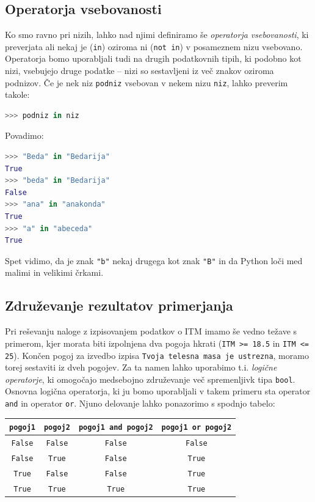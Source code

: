 \subsection{Operatorja vsebovanosti}

Ko smo ravno pri nizih, lahko nad njimi definiramo še \emph{operatorja vsebovanosti}, ki preverjata ali nekaj je (\texttt{in}) oziroma ni (\texttt{not in}) v posameznem nizu vsebovano. Operatorja bomo uporabljali tudi na drugih podatkovnih tipih, ki podobno kot nizi, vsebujejo druge podatke -- nizi so sestavljeni iz več znakov oziroma podnizov. Če je nek niz \texttt{podniz} vsebovan v nekem nizu \texttt{niz}, lahko preverim takole:
\begin{lstlisting}[language=Python, showstringspaces=false]
>>> podniz in niz
\end{lstlisting}
Povadimo:
\begin{lstlisting}[language=Python, showstringspaces=false]
>>> "Beda" in "Bedarija"
True
>>> "beda" in "Bedarija"
False
>>> "ana" in "anakonda"
True
>>> "a" in "abeceda"
True
\end{lstlisting}
Spet vidimo, da je znak \texttt{"b"} nekaj drugega kot znak \texttt{"B"} in da Python loči med malimi in velikimi črkami.

\subsection{Združevanje rezultatov primerjanja}

Pri reševanju naloge z izpisovanjem podatkov o ITM imamo še vedno težave s primerom, kjer morata biti izpolnjena dva pogoja hkrati (\texttt{ITM >= 18.5} in \texttt{ITM <= 25}). Končen pogoj za izvedbo izpisa \texttt{Tvoja telesna masa je ustrezna}, moramo torej sestaviti iz dveh pogojev. Za ta namen lahko uporabimo t.i. \emph{logične operatorje}, ki omogočajo medsebojno združevanje več spremenljivk tipa \texttt{bool}. Osnovna logična operatorja, ki ju bomo uporabljali v takem primeru sta operator \texttt{and} in operator \texttt{or}. Njuno delovanje lahko ponazorimo s spodnjo tabelo:

\begin{tabular}{cc|cc}
     \texttt{pogoj1} & \texttt{pogoj2}  & \texttt{pogoj1 and pogoj2} & \texttt{pogoj1 or pogoj2}\\
     \hline
     \texttt{False} & \texttt{False} & \texttt{False} & \texttt{False} \\
     \texttt{False} & \texttt{True} & \texttt{False} & \texttt{True} \\
     \texttt{True} & \texttt{False} & \texttt{False} & \texttt{True} \\
     \texttt{True} & \texttt{True} & \texttt{True} & \texttt{True} \\
\end{tabular}

